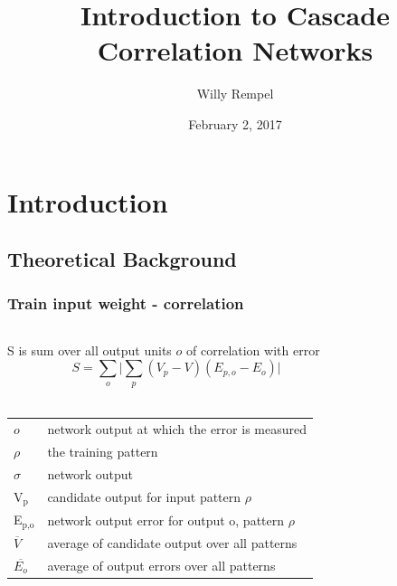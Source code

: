 \documentclass{beamer}
\title{Introduction to Cascade Correlation Networks}
\author{Willy Rempel}
\date{February 2, 2017}
\begin{document}
\frame{\titlepage}
\section[Outline]{}
\frame{\tableofcontents}

\section{Introduction}
\subsection{Theoretical Background}

\begin{frame}
  \frametitle{Train input weight - correlation}
	\begin{columns}[t]
		\begin{column}[t]{0.5\textwidth}
      \small{S is sum over all output units $\mathit{o}$ of correlation with error}
      $$ S = \sum_{o} \lvert \sum_{p} (V_{p} - V) (E_{p,o} - E_{o}) \rvert $$
     \\  
      \begin{center}
        \begin{tabular}{ll}
          \(\mathit{o}\) & \tiny{network output at which the error is measured}\\
          \(\rho\) & \tiny{the training pattern}\\
          \(\sigma\) & \tiny{network output} \\
          V\(_{\text{p}}\) & \tiny{candidate output for input pattern} \(\rho\)\\
          E\(_{\text{p,o}}\) & \tiny{network output error for output o, pattern} \(\rho\)\\
          \(\overline{V}\) & \tiny{average of candidate output over all patterns} \\
          \(\overline{E_{o}}\) & \tiny{average of output errors over all patterns} \\
        \end{tabular}
      \end{center}
		\end{column}
		\begin{column}{0.5\textwidth}
      \begin{figure}
        \centering

\end{figure}
\end{column}
\end{columns}
\end{frame}
\end{document}
